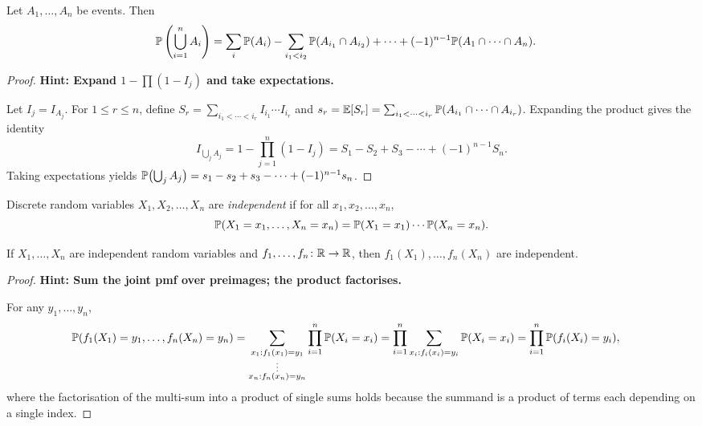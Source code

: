 \documentclass[a4paper]{article}
\begin{document}
\begin{thm}
  Let $A_1, \dotsc, A_n$ be events. Then
  \begin{align*}
    \P\left(\bigcup_{i=1}^n A_i\right) &= \sum_{i} \P(A_i) - \sum_{i_1 < i_2} \P(A_{i_1}\cap A_{i_2}) + \cdots + (-1)^{n - 1} \P(A_1\cap \cdots \cap A_n).
  \end{align*}
\end{thm}

\begin{proof}
  \textbf{Hint: Expand $1 - \prod(1 - I_j)$ and take expectations.}

  Let $I_j = I_{A_j}$. For $1 \leq r \leq n$, define $S_r = \sum_{i_1 < \cdots < i_r}I_{i_1}\cdots I_{i_r}$ and $s_r = \E[S_r] = \sum_{i_1 < \cdots < i_r}\P(A_{i_1}\cap \cdots \cap A_{i_r})$. Expanding the product gives the identity
  \[
    I_{\bigcup_j A_j} = 1 - \prod_{j = 1}^n(1 - I_j) = S_1 - S_2 + S_3 - \cdots + (-1)^{n - 1}S_n.
  \]
  Taking expectations yields $\P\bigl(\bigcup_j A_j\bigr) = s_1 - s_2 + s_3 - \cdots + (-1)^{n - 1}s_n$.
\end{proof}

\begin{defi}
  Discrete random variables $X_1, X_2, \dotsc, X_n$ are \emph{independent} if for all $x_1, x_2, \dotsc, x_n$,
  \[
    \P(X_1 = x_1, \dotsc, X_n = x_n) = \P(X_1 = x_1)\cdots \P(X_n = x_n).
  \]
\end{defi}

\begin{prop}
  If $X_1, \dotsc, X_n$ are independent random variables and $f_1, \dotsc, f_n\colon \R \to \R$, then $f_1(X_1), \dotsc, f_n(X_n)$ are independent.
\end{prop}

\begin{proof}
  \textbf{Hint: Sum the joint pmf over preimages; the product factorises.}

  For any $y_1, \dotsc, y_n$,
  \begin{align*}
    \P(f_1(X_1) = y_1, \dotsc, f_n(X_n) = y_n) &= \sum_{\substack{x_1: f_1(x_1) = y_1\\\vdots\\x_n: f_n(x_n) = y_n}} \prod_{i = 1}^n \P(X_i = x_i) = \prod_{i = 1}^n \sum_{x_i:f_i(x_i) = y_i} \P(X_i = x_i) = \prod_{i = 1}^n \P(f_i(X_i) = y_i),
  \end{align*}
  where the factorisation of the multi-sum into a product of single sums holds because the summand is a product of terms each depending on a single index.
\end{proof}
\end{document}
